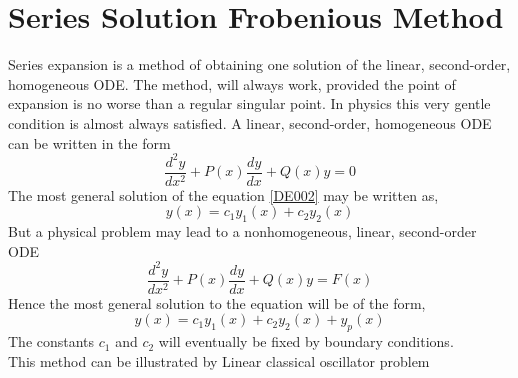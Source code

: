 \section{Series Solution Frobenious Method}
Series expansion is a  method of obtaining one solution of the linear, second-order, homogeneous ODE. The method, will always work, provided the point of expansion is no worse than a regular singular point. In physics this very gentle condition is almost always satisfied.
A linear, second-order, homogeneous ODE can be written in the form
\begin{equation}
\frac{d^{2} y}{d x^{2}}+P(x) \frac{d y}{d x}+Q(x) y=0 \label{DE002}
\end{equation}
The most general solution of the equation \ref{DE002} may be written as,
\begin{equation}
y(x)=c_{1} y_{1}(x)+c_{2} y_{2}(x)
\end{equation}
But a physical problem may lead to a nonhomogeneous, linear, second-order ODE
\begin{equation}
\frac{d^{2} y}{d x^{2}}+P(x) \frac{d y}{d x}+Q(x) y=F(x)\label{DE003}
\end{equation}
Hence the most general solution to the equation \label{DE003} will be of the form,
\begin{equation}
y(x)=c_{1} y_{1}(x)+c_{2} y_{2}(x)+y_{p}(x)
\end{equation}
The constants $c_{1}$ and $c_{2}$ will eventually be fixed by boundary conditions.\\
This method can be illustrated by Linear classical oscillator problem
